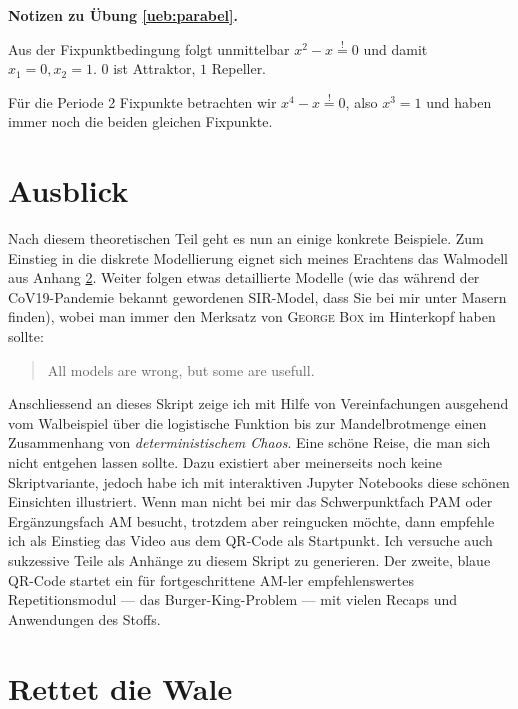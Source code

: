 \documentclass[%
11pt,%
twoside,%
titlepage,%
german,%
headsepline%
]{scrartcl}
\newcounter{theo}[section]\setcounter{theo}{0}
\newcommand{\concatueb}[1]{ueb:#1}%
\newcommand{\concatlsg}[1]{lsg:#1}%
\newenvironment{lsg}[1]{%
    \par\noindent\textbf{Notizen zu Übung \ref{\concatueb{#1}}.}%
    \label{\concatlsg{#1}}
}{%
    \par%
}
\begin{document}
\begin{lsg}{parabel}
    Aus der Fixpunktbedingung folgt unmittelbar $x^2-x\stackrel{!}{=}0$ und damit $x_1=0, x_2=1$. $0$ ist Attraktor, $1$ Repeller.

    Für die Periode 2 Fixpunkte betrachten wir $x^4-x\stackrel{!}{=}0$, also $x^3=1$ und haben immer noch die beiden gleichen Fixpunkte.
\end{lsg}

\clearpage

\section{Ausblick}

Nach
diesem theoretischen Teil geht es nun an einige konkrete Beispiele. Zum Einstieg in die diskrete Modellierung eignet sich meines Erachtens das Walmodell aus Anhang \ref{anhang:wale}. Weiter folgen etwas detaillierte Modelle (wie das während der CoV19-Pandemie bekannt gewordenen SIR-Model, dass Sie bei mir unter Masern finden), wobei man immer den Merksatz von \textsc{George Box} im Hinterkopf haben sollte:

\begin{quote}
    All models are wrong, but some are usefull.
\end{quote}

Anschliessend
an dieses Skript zeige ich mit Hilfe von Vereinfachungen ausgehend vom Walbeispiel über die logistische Funktion bis zur Mandelbrotmenge einen Zusammenhang von \emph{deterministischem Chaos}. Eine schöne Reise, die man sich nicht entgehen lassen sollte. Dazu existiert aber meinerseits noch keine Skriptvariante, jedoch habe ich mit interaktiven Jupyter Notebooks diese schönen Einsichten illustriert. Wenn man nicht bei mir das Schwerpunktfach PAM oder Ergänzungsfach AM besucht, trotzdem aber reingucken möchte, dann empfehle ich als Einstieg das Video aus dem QR-Code als Startpunkt. Ich versuche auch sukzessive Teile als Anhänge zu diesem Skript zu generieren. Der
zweite, blaue QR-Code startet ein für fortgeschrittene AM-ler empfehlenswertes Repetitionsmodul --- das Burger-King-Problem --- mit vielen Recaps und Anwendungen des Stoffs.

\clearpage

\appendix

\section{Rettet die Wale}\label{anhang:wale}
\end{document}
